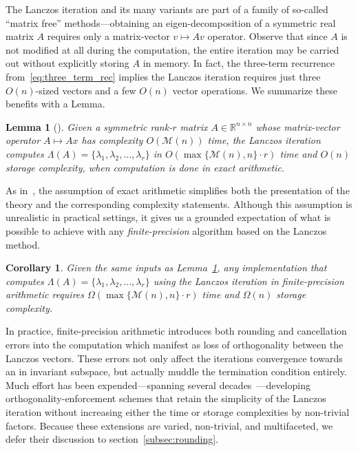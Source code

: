 \documentclass[10pt]{article}
\numberwithin{equation}{section}
\newcommand{\+}{%
	\raisebox{0.18ex}{\scaleobj{0.55}{+}}
}
\newtheorem{corollary}{Corollary}
\newtheorem{lemma}{Lemma}
\theoremstyle{definition}
\begin{document}
 The Lanczos iteration and its many variants are part of a family of so-called ``matrix free'' methods---obtaining an eigen-decomposition of a symmetric real matrix $A$ requires only a matrix-vector $v \mapsto Av$ operator. 
 Observe that since $A$ is not modified at all during the computation, the entire iteration may be carried out without explicitly storing $A$ in memory. 
 In fact, the three-term recurrence from~\eqref{eq:three_term_rec} implies the Lanczos iteration requires just three $O(n)$-sized vectors and a few $O(n)$ vector operations. We summarize these benefits with a Lemma. 
\begin{lemma}[\cite{parlett1994we, simon1984analysis}]\label{lemma:exact_arith_lanczos}
	Given a symmetric rank-$r$ matrix $A \in \mathbb{R}^{n \times n}$ whose matrix-vector operator $A \mapsto A x$ has complexity $O(\mathcal{M}(n))$ time, the Lanczos iteration computes $\Lambda(A) = \{ \lambda_1, \lambda_2, \dots, \lambda_r \}$ in $O(\max\{\mathcal{M}(n), n\}\cdot r)$ time and $O(n)$ storage complexity, when computation is done in exact arithmetic. 
\end{lemma}
\noindent As in~\cite{parlett1994we}, the assumption of exact arithmetic simplifies both the presentation of the theory and the corresponding complexity statements. 
Although this assumption is unrealistic in practical settings, it gives us a grounded expectation of what is possible to achieve with any \emph{finite-precision} algorithm based on the Lanczos method.
\begin{corollary}\label{cor:finite_arith_lanczos}
	Given the same inputs as Lemma~\ref{lemma:exact_arith_lanczos}, any implementation that computes $\Lambda(A) = \{ \lambda_1, \lambda_2, \dots, \lambda_r \}$ using the Lanczos iteration in finite-precision arithmetic requires $\Omega(\max\{\mathcal{M}(n), n\} \cdot r)$ time and $\Omega(n)$ storage complexity. 
\end{corollary}
\noindent
In practice, finite-precision arithmetic introduces both rounding and cancellation errors into the computation which manifest as loss of orthogonality between the Lanczos vectors. These errors not only affect the iterations convergence towards an in invariant subspace, but actually muddle the termination condition entirely. 
Much effort has been expended---spanning several decades~\cite{}---developing orthogonality-enforcement schemes that retain the simplicity of the Lanczos iteration without increasing either the time or storage complexities by non-trivial factors. 
Because these extensions are varied, non-trivial, and multifaceted, we defer their discussion to section~\ref{subsec:rounding}. 
\end{document}
